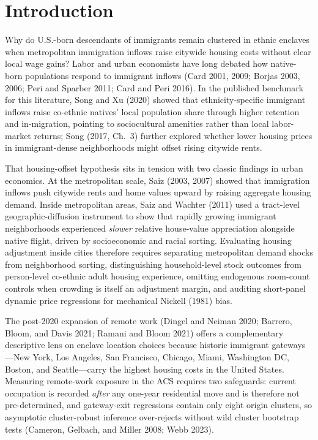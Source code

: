 \documentclass[11pt]{article}
\begin{document}
\vspace{1.0em}
\section{Introduction}

Why do U.S.-born descendants of immigrants remain clustered in ethnic enclaves when metropolitan immigration inflows raise citywide housing costs without clear local wage gains? Labor and urban economists have long debated how native-born populations respond to immigrant inflows (Card 2001, 2009; Borjas 2003, 2006; Peri and Sparber 2011; Card and Peri 2016). In the published benchmark for this literature, Song and Xu (2020) showed that ethnicity-specific immigrant inflows raise co-ethnic natives' local population share through higher retention and in-migration, pointing to sociocultural amenities rather than local labor-market returns; Song (2017, Ch.\ 3) further explored whether lower housing prices in immigrant-dense neighborhoods might offset rising citywide rents.

That housing-offset hypothesis sits in tension with two classic findings in urban economics. At the metropolitan scale, Saiz (2003, 2007) showed that immigration inflows push citywide rents and home values upward by raising aggregate housing demand. Inside metropolitan areas, Saiz and Wachter (2011) used a tract-level geographic-diffusion instrument to show that rapidly growing immigrant neighborhoods experienced \emph{slower} relative house-value appreciation alongside native flight, driven by socioeconomic and racial sorting. Evaluating housing adjustment inside cities therefore requires separating metropolitan demand shocks from neighborhood sorting, distinguishing household-level stock outcomes from person-level co-ethnic adult housing experience, omitting endogenous room-count controls when crowding is itself an adjustment margin, and auditing short-panel dynamic price regressions for mechanical Nickell (1981) bias.

The post-2020 expansion of remote work (Dingel and Neiman 2020; Barrero, Bloom, and Davis 2021; Ramani and Bloom 2021) offers a complementary descriptive lens on enclave location choices because historic immigrant gateways---New York, Los Angeles, San Francisco, Chicago, Miami, Washington DC, Boston, and Seattle---carry the highest housing costs in the United States. Measuring remote-work exposure in the ACS requires two safeguards: current occupation is recorded \emph{after} any one-year residential move and is therefore not pre-determined, and gateway-exit regressions contain only eight origin clusters, so asymptotic cluster-robust inference over-rejects without wild cluster bootstrap tests (Cameron, Gelbach, and Miller 2008; Webb 2023).
\end{document}
